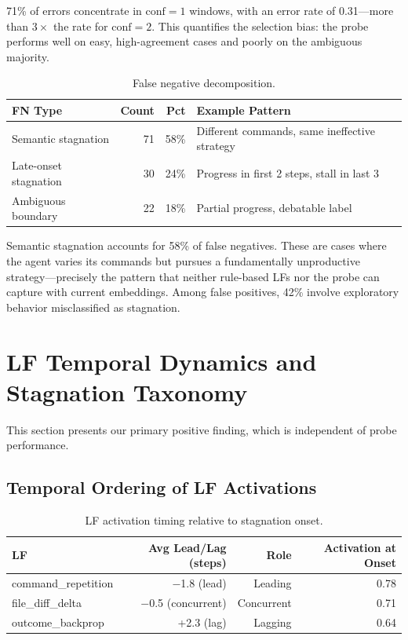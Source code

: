 \documentclass[11pt]{article}
\begin{document}
71\% of errors concentrate in $\text{conf}\!=\!1$ windows, with an error rate of 0.31---more than $3\times$ the rate for $\text{conf}\!=\!2$.
This quantifies the selection bias: the probe performs well on easy, high-agreement cases and poorly on the ambiguous majority.

\begin{table}[h]
\centering
\caption{False negative decomposition.}
\label{tab:fn_types}
\begin{tabular}{lrrl}
\toprule
\textbf{FN Type} & \textbf{Count} & \textbf{Pct} & \textbf{Example Pattern} \\
\midrule
Semantic stagnation & 71 & 58\% & Different commands, same ineffective strategy \\
Late-onset stagnation & 30 & 24\% & Progress in first 2 steps, stall in last 3 \\
Ambiguous boundary & 22 & 18\% & Partial progress, debatable label \\
\bottomrule
\end{tabular}
\end{table}

Semantic stagnation accounts for 58\% of false negatives.
These are cases where the agent varies its commands but pursues a fundamentally unproductive strategy---precisely the pattern that neither rule-based LFs nor the probe can capture with current embeddings.
Among false positives, 42\% involve exploratory behavior misclassified as stagnation.

\section{LF Temporal Dynamics and Stagnation Taxonomy}
\label{sec:lf_dynamics}

This section presents our primary positive finding, which is independent of probe performance.

\subsection{Temporal Ordering of LF Activations}

\begin{table}[h]
\centering
\caption{LF activation timing relative to stagnation onset.}
\label{tab:lf_temporal}
\begin{tabular}{lrrr}
\toprule
\textbf{LF} & \textbf{Avg Lead/Lag (steps)} & \textbf{Role} & \textbf{Activation at Onset} \\
\midrule
command\_repetition & $-$1.8 (lead) & Leading & 0.78 \\
file\_diff\_delta & $-$0.5 (concurrent) & Concurrent & 0.71 \\
outcome\_backprop & +2.3 (lag) & Lagging & 0.64 \\
\bottomrule
\end{tabular}
\end{table}
\end{document}
